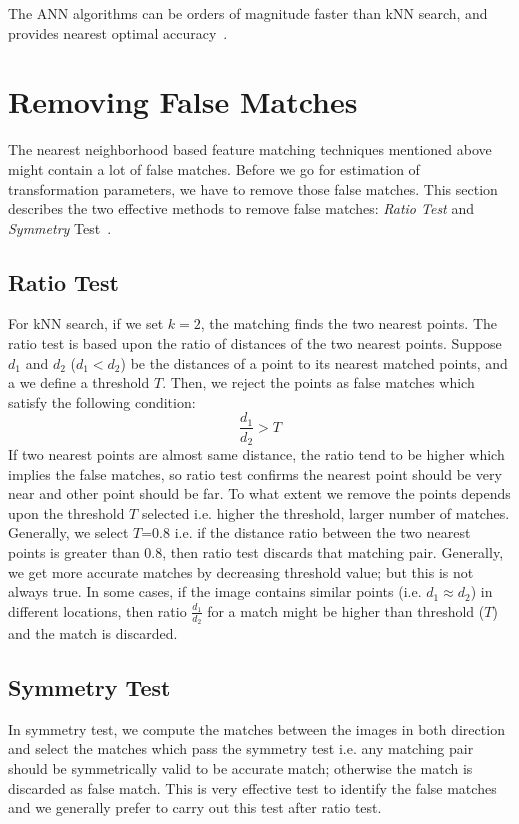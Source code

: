 \noindent The ANN algorithms can be orders of magnitude faster than kNN search, and provides nearest optimal accuracy~\cite{muja:09}. 


\section{Removing False Matches}
The nearest neighborhood based feature matching techniques mentioned above might contain a lot of false matches. Before we go for estimation of transformation parameters, we have to remove those false matches. This section describes the two effective methods to remove false matches: \emph{Ratio Test} and \emph{Symmetry} Test~\cite{Laganière:11}. 
\subsection{Ratio Test}
\label{sec:ratio-test}
For kNN search, if we set $k=2$, the matching finds the two nearest points. The ratio test is based upon the ratio of distances of the two nearest points. Suppose $d_1$ and $d_2$ ($d_1<d_2$) be the distances of a point to its nearest matched points, and a we define a threshold $T$. Then, we reject the points as false matches which satisfy the following condition:
\begin{equation}
\frac{d_1}{d_2}>T
\label{eq:ratio-test}
\end{equation}
If two nearest points are almost same distance, the ratio tend to be higher which implies the false matches, so ratio test confirms the nearest point should be very near and other point should be far. To what extent we remove the points depends upon the threshold $T$ selected i.e. higher the threshold, larger number of matches. Generally, we select $T$=0.8 i.e. if the distance ratio between the two nearest points is greater than 0.8, then ratio test discards that matching pair. Generally, we get more accurate matches by decreasing threshold value; but this is not always true. In some cases, if the image contains similar points (i.e. $d_1 \approx d_2$) in different locations, then ratio $\frac{d_1}{d_2}$ for a match might be higher than threshold ($T$) and the match is discarded.


\subsection{Symmetry Test}
\label{sec:symmetry-test}
In symmetry test, we compute the matches between the images in both direction and select the matches which pass the symmetry test i.e. any matching pair should be symmetrically valid to be accurate match; otherwise the match is discarded as false match. This is very effective test to identify the false matches and we generally prefer to carry out this test after ratio test.\\

